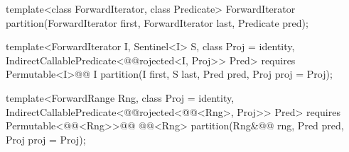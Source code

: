 %
\begin{removedblock}
\begin{itemdecl}
template<class ForwardIterator, class Predicate>
  ForwardIterator
    partition(ForwardIterator first,
              ForwardIterator last, Predicate pred);
\end{itemdecl}
\end{removedblock}
\begin{addedblock}
\begin{itemdecl}
template<ForwardIterator I, Sentinel<I> S, class Proj = identity,
    IndirectCallablePredicate<@@rojected<I, Proj>> Pred>
  requires Permutable<I>@\newtxt{()}@
  I partition(I first, S last, Pred pred, Proj proj = Proj{});

template<ForwardRange Rng, class Proj = identity,
    IndirectCallablePredicate<@@rojected<@@<Rng>, Proj>> Pred>
  requires Permutable<@@<Rng>>@\newtxt{()}@
  @@<Rng>
    partition(Rng&@\newtxt{\&}@ rng, Pred pred, Proj proj = Proj{});
\end{itemdecl}
\end{addedblock}


